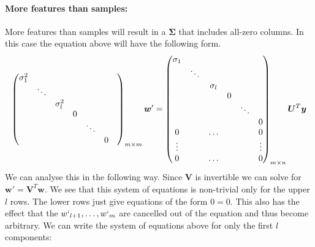 \paragraph{More features than samples:}
More features than samples will result in a $\bm{\Sigma}$ that includes all-zero columns.
In this case the equation above will have the following form.
\begin{align}
    \begin{pmatrix}
        \sigma_{1}^2 &        &               &   & &      &   \\
                     & \ddots &               &   & &      &   \\
                     &        &  \sigma_{l}^2 &   & &      &   \\
                     &        &               & 0 & &      &   \\
                     &        &               &   & \ddots &   \\                     
                     &        &               &   &        & 0 \\                     
    \end{pmatrix}_{m \times m} \bm{w}' = 
    \begin{pmatrix}
        \sigma_{1}   &        &               &   &        &   \\
                     & \ddots &               &   &        &   \\
                     &        &  \sigma_{l}   &   &        &   \\
                     &        &               & 0 &        &   \\
                     &        &               &   & \ddots &   \\  
                     &        &               &   &        & 0 \\
        0            &        &  \hdots       &   &        & 0      \\
        \vdots       &        &               &   &        & \vdots \\
        0            &        &  \hdots       &   &        & 0      \\                     
    \end{pmatrix}_{m \times n}\bm{U}^T \bm{y} \\
\end{align}
We can analyse this in the following way. 
Since $\bm{V}$ is invertible we can solve for $\bm{w}' = \bm{V}^T \bm{w}$.
We see that this system of equations is non-trivial only for the upper $l$ rows.
The lower rows just give equations of the form $0=0$. This also has the effect that 
the $w`_{l+1}, \hdots, w`_{m}$ are cancelled out of the equation and thus become arbitrary.
We can write the system of equations above for only the first $l$ components:

